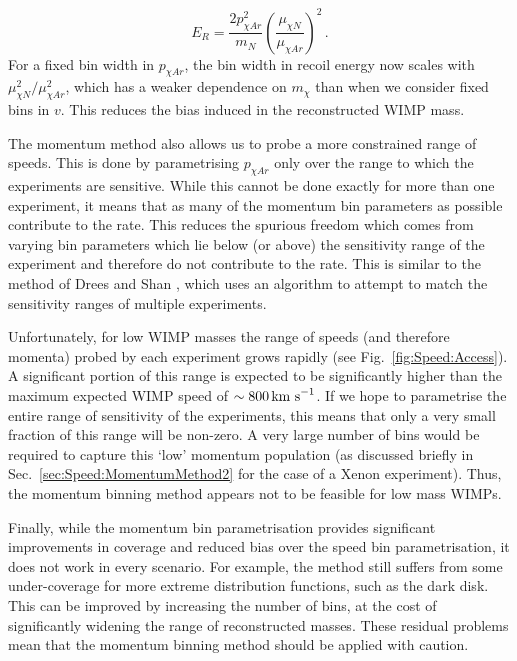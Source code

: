 \begin{equation}
E_R = \frac{2 p_{\chi Ar}^2}{m_N} \left(\frac{\mu_{\chi N}}{\mu_{\chi Ar}}\right)^2\,.
\end{equation}
For a fixed bin width in $p_{\chi Ar}$, the bin width in recoil energy now scales with$\mu_{\chi N}^2/ \mu_{\chi Ar}^2$, which has a weaker dependence on $m_\chi$ than when we consider fixed bins in $v$. This reduces the bias induced in the reconstructed WIMP mass. 

The momentum method also allows us to probe a more constrained range of speeds. This is done by parametrising $p_{\chi Ar}$ only over the range to which the experiments are sensitive. While this cannot be done exactly for more than one experiment, it means that as many of the momentum bin parameters as possible contribute to the rate. This reduces the spurious freedom which comes from varying bin parameters which lie below (or above) the sensitivity range of the experiment and therefore do not contribute to the rate.  This is similar to the method of Drees and Shan \cite{Drees:2008}, which uses an algorithm to attempt to match the sensitivity ranges of multiple experiments.

Unfortunately, for low WIMP masses the range of speeds (and therefore momenta) probed by each experiment grows rapidly (see Fig.~\ref{fig:Speed:Access}). A significant portion of this range is expected to be significantly higher than the maximum expected WIMP speed of $\sim 800 \,\textrm{km s}^{-1}$. If we hope to parametrise the entire range of sensitivity of the experiments, this means that only a very small fraction of this range will be non-zero. A very large number of bins would be required to capture this `low' momentum population (as discussed briefly in Sec.~\ref{sec:Speed:MomentumMethod2} for the case of a Xenon experiment). Thus, the momentum binning method appears not to be feasible for low mass WIMPs.



Finally, while the momentum bin parametrisation provides significant improvements in coverage and reduced bias over the speed bin parametrisation, it does not work in every scenario. For example, the method still suffers from some under-coverage for more extreme distribution functions, such as the dark disk. This can be improved by increasing the number of bins, at the cost of significantly widening the range of reconstructed masses. These residual problems mean that the momentum binning method should be applied with caution. 

